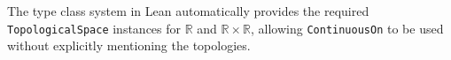 The type class system in Lean automatically provides the required
\lstinline[language=lean]|TopologicalSpace| instances for $\mathbb{R}$
and $\mathbb{R} \times \mathbb{R}$, allowing \lstinline[language=lean]|ContinuousOn|
to be used without explicitly mentioning the topologies.










